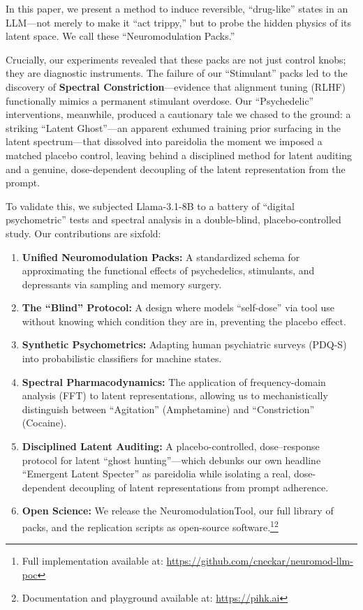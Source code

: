 \documentclass[10pt]{article}
\begin{document}
In this paper, we present a method to induce reversible, ``drug-like'' states in an LLM—not merely to make it ``act trippy,'' but to probe the hidden physics of its latent space. We call these ``Neuromodulation Packs.''

Crucially, our experiments revealed that these packs are not just control knobs; they are diagnostic instruments. The failure of our ``Stimulant'' packs led to the discovery of \textbf{Spectral Constriction}—evidence that alignment tuning (RLHF) functionally mimics a permanent stimulant overdose. Our ``Psychedelic'' interventions, meanwhile, produced a cautionary tale we chased to the ground: a striking ``Latent Ghost''—an apparent exhumed training prior surfacing in the latent spectrum—that dissolved into pareidolia the moment we imposed a matched placebo control, leaving behind a disciplined method for latent auditing and a genuine, dose-dependent decoupling of the latent representation from the prompt.

To validate this, we subjected Llama-3.1-8B to a battery of ``digital psychometric'' tests and spectral analysis in a double-blind, placebo-controlled study. Our contributions are sixfold:

\begin{enumerate}
    \item \textbf{Unified Neuromodulation Packs:} A standardized schema for approximating the functional effects of psychedelics, stimulants, and depressants via sampling and memory surgery.
    \item \textbf{The ``Blind'' Protocol:} A design where models ``self-dose'' via tool use without knowing which condition they are in, preventing the placebo effect.
    \item \textbf{Synthetic Psychometrics:} Adapting human psychiatric surveys (PDQ-S) into probabilistic classifiers for machine states.
    \item \textbf{Spectral Pharmacodynamics:} The application of frequency-domain analysis (FFT) to latent representations, allowing us to mechanistically distinguish between ``Agitation'' (Amphetamine) and ``Constriction'' (Cocaine).
    \item \textbf{Disciplined Latent Auditing:} A placebo-controlled, dose--response protocol for latent ``ghost hunting''---which debunks our own headline ``Emergent Latent Specter'' as pareidolia while isolating a real, dose-dependent decoupling of latent representations from prompt adherence.
    \item \textbf{Open Science:} We release the NeuromodulationTool, our full library of packs, and the replication scripts as open-source software.\footnote{Full implementation available at: \url{https://github.com/cneckar/neuromod-llm-poc}}\footnote{Documentation and playground available at: \url{https://pihk.ai}}
\end{enumerate}
\end{document}

